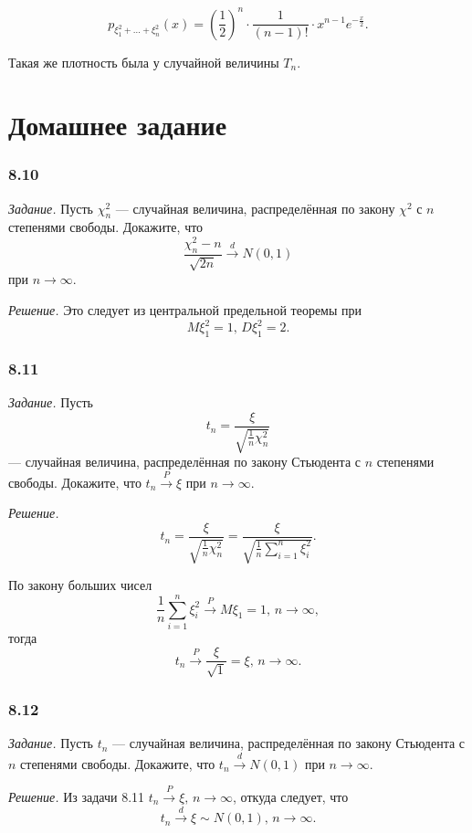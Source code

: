 $$p_{ \xi_1^2 + \dotsc + \xi_n^2} \left( x \right) =
  \left( \frac{1}{2} \right)^n \cdot \frac{1}{ \left( n - 1 \right)!} \cdot
  x^{n - 1} e^{- \frac{x}{2}}.$$

Такая же плотность была у случайной величины $T_n$.

\section*{Домашнее задание}

\subsubsection*{8.10}

\textit{Задание.}
Пусть $ \chi_n^2$ --- случайная величина,
распределённая по закону $ \chi^2$ с $n$ степенями свободы.
Докажите, что
$$ \frac{ \chi_n^2 - n}{ \sqrt{2n}} \overset{d}{ \rightarrow}
  N \left( 0, 1 \right) $$
при $n \to \infty $.

\textit{Решение.}
Это следует из центральной предельной теоремы при
$$M \xi_1^2 = 1, \,
  D \xi_1^2 = 2.$$


\subsubsection*{8.11}

\textit{Задание.} Пусть
$$t_n =
  \frac{ \xi }{ \sqrt{ \frac{1}{n} \chi_n^2}}$$
--- случайная величина, распределённая по закону Стьюдента с $n$ степенями свободы.
Докажите, что $t_n \overset{P}{ \rightarrow } \xi $ при $n \to \infty $.

\textit{Решение.}
$$t_n =
  \frac{ \xi }{ \sqrt{ \frac{1}{n} \chi_n^2}} =
  \frac{ \xi }{ \sqrt{ \frac{1}{n} \sum \limits_{i = 1}^n \xi_i^2}}.$$

По закону больших чисел
$$ \frac{1}{n} \sum \limits_{i = 1}^n  \xi_i^2 \overset{P}{ \rightarrow }
  M \xi_1 =
  1, \,
  n \to \infty,$$
тогда
$$t_n \overset{P}{ \rightarrow } \frac{ \xi }{ \sqrt{1}} = \xi, \,
  n \to \infty.$$

\subsubsection*{8.12}

\textit{Задание.}
Пусть $t_n$ --- случайная величина, распределённая по закону Стьюдента с $n$ степенями свободы.
Докажите, что $t_n \overset{d}{ \rightarrow } N \left( 0, 1 \right) $ при $n \to \infty $.

\textit{Решение.}
Из задачи 8.11 $t_n \overset{P}{ \rightarrow } \xi, \, n \to \infty $, откуда следует,
что
$$t_n \overset{d}{ \rightarrow} \xi \sim N \left( 0, 1 \right), \,
  n \to \infty.$$
